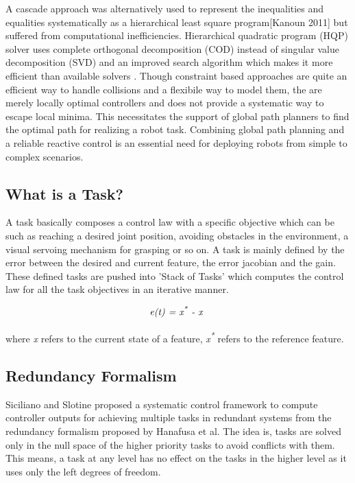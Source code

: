 A cascade approach was alternatively used to represent the inequalities and equalities systematically as a hierarchical least square program[Kanoun 2011] but suffered from computational inefficiencies. Hierarchical quadratic program (HQP) solver uses complete orthogonal decomposition (COD) instead of singular value decomposition (SVD) and an improved search algorithm which makes it more efficient than available solvers \cite{escande2014hierarchical}. Though constraint based approaches are quite an efficient way to handle collisions and a flexibile way to model them, the are merely locally optimal controllers and does not provide a systematic way to escape local minima. This necessitates the support of global path planners to find the optimal path for realizing a robot task. Combining global path planning and a reliable reactive control is an essential need for deploying robots from simple to complex scenarios.

 
\subsection{What is a Task?}
A task basically composes a control law with a specific objective which can be such as reaching a desired joint position, avoiding obstacles in the environment, a visual servoing mechanism for grasping or so on. A task is mainly defined by the error between the desired and current feature, the error jacobian and the gain. These defined tasks are pushed into 'Stack of Tasks' which computes the control law for all the task objectives in an iterative manner\cite{mansard2007task}. 

\[\textit{e(t) = x\textsuperscript{*} - x }\]

where \textit{x} refers to the current state of a feature, \textit{x\textsuperscript{*}} refers to the reference feature.

\subsection{Redundancy Formalism}
Siciliano and Slotine proposed a systematic control framework to compute controller outputs for achieving multiple tasks in redundant systems from the redundancy formalism proposed by Hanafusa et al. The idea is, tasks are solved only in the null space of the higher priority tasks to avoid conflicts with them. This means, a task at any level has no effect on the tasks in the higher level as it uses only the left degrees of freedom. 

